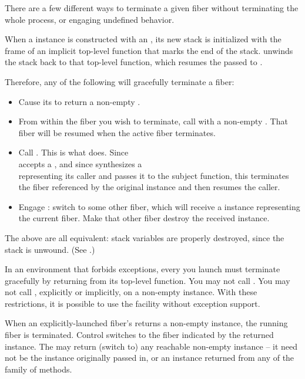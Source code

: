 
There are a few different ways to terminate a given fiber without
terminating the whole process, or engaging undefined behavior.

When a \fiber instance is constructed with an \entryfn, its new stack is
initialized with the frame of an implicit top-level function that marks the
end of the stack. \unwindfib unwinds the stack back to
that top-level function, which resumes the \fiber passed to \unwindfib.

Therefore, any of the following will gracefully terminate a fiber:

\begin{itemize}
    \item Cause its \entryfn to return a non-empty \fiber.
    \item From within the fiber you wish to terminate, call \unwindfib with a
          non-empty \fiber. That fiber will be resumed
          when the active fiber terminates.
    \item Call . This is what \dtor
          does. Since\\\unwindfib accepts a \fiber, and since \resumewith
          synthesizes a\\\fiber representing its caller and passes it to the
          subject function, this terminates the fiber referenced by the
          original \fiber instance and then resumes the caller.
    \item Engage \dtor: switch to some other fiber, which will
          receive a \fiber instance representing the current fiber. Make that
          other fiber destroy the received \fiber instance.
\end{itemize}

The above are all equivalent: stack variables are properly destroyed, since
the stack is unwound. (See .)

In an environment that forbids exceptions, every \fiber you launch must
terminate gracefully by returning from its top-level function. You may not
call \unwindfib. You may not call \dtor, explicitly or implicitly, on a
non-empty \fiber instance. With these restrictions, it is possible to use
the \fiber facility without exception support.

When an explicitly-launched fiber's \entryfn returns a non-empty \fiber
instance, the running fiber is terminated. Control switches to the fiber
indicated by the returned \fiber instance. The \entryfn may return (switch to)
any reachable non-empty \fiber instance -- it need not be the instance originally
passed in, or an instance returned from any of the \resume family of
methods.


